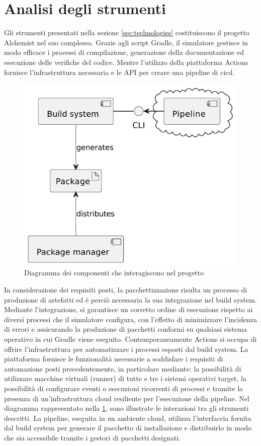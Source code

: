 \section{Analisi degli strumenti}

Gli strumenti presentati nella sezione \ref{sec:technologies} costituiscono il progetto Alchemist nel suo complesso. Grazie agli script Gradle, il simulatore gestisce in modo efficace i processi di compilazione, generazione della documentazione ed esecuzione delle verifiche del codice. Mentre l'utilizzo della piattaforma Actions fornisce l'infrastruttura necessaria e le API per creare una pipeline di \ac{cicd}. 

\begin{figure}[htb]
	\centering
	\includegraphics[width=.6\linewidth]{figures/components-diagram.pdf}
	\caption{Diagramma dei componenti che interagiscono nel progetto}
	\label{fig:components-diagram}
\end{figure}

In considerazione dei requisiti posti, la pacchettizzazione risulta un processo di produzione di artefatti ed è perciò necessaria la sua integrazione nel build system. Mediante l'integrazione, si garantisce un corretto ordine di esecuzione rispetto ai diversi processi che il simulatore configura, con l'effetto di minimizzare l'incidenza di errori e assicurando la produzione di pacchetti conformi su qualsiasi sistema operativo in cui Gradle viene eseguito. Contemporaneamente Actions si occupa di offrire l'infrastruttura per automatizzare i processi esposti dal build system. La piattaforma fornisce le funzionalità necessarie a soddisfare i requisiti di automazione posti precedentemente, in particolare mediante: la possibilità di utilizzare macchine virtuali (runner) di tutte e tre i sistemi operativi target, la possibilità di configurare eventi o esecuzioni ricorrenti di processi e tramite la presenza di un'infrastruttura cloud resiliente per l'esecuzione della pipeline. Nel diagramma rappresentato nella \cref{fig:components-diagram}, sono illustrate le interazioni tra gli strumenti descritti. La pipeline, eseguita in un ambiente cloud, utilizza l'interfaccia fornita dal build system per generare il pacchetto di installazione e distribuirlo in modo che sia accessibile tramite i gestori di pacchetti designati.

